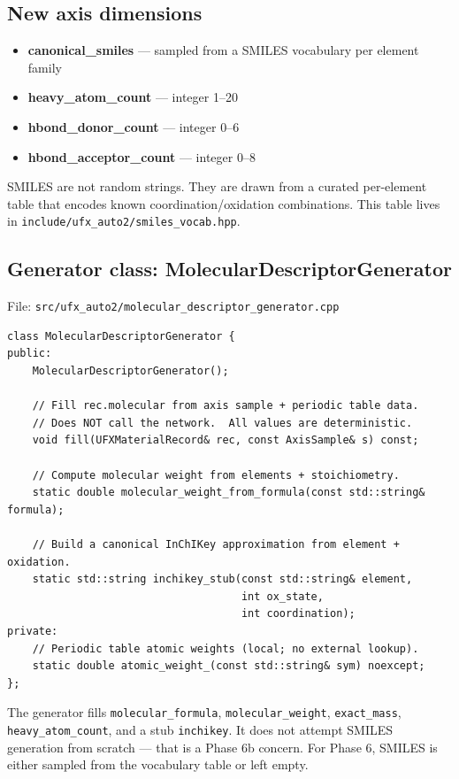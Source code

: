 \documentclass[11pt, a4paper]{article}
\begin{document}
\subsection{New axis dimensions}

\begin{itemize}[leftmargin=*, itemsep=2pt]
  \item \textbf{canonical\_smiles} --- sampled from a SMILES vocabulary per element family
  \item \textbf{heavy\_atom\_count} --- integer 1--20
  \item \textbf{hbond\_donor\_count} --- integer 0--6
  \item \textbf{hbond\_acceptor\_count} --- integer 0--8
\end{itemize}

SMILES are not random strings.  They are drawn from a curated per-element table
that encodes known coordination/oxidation combinations.  This table lives in
\texttt{include/ufx\_auto2/smiles\_vocab.hpp}.

\subsection{Generator class: MolecularDescriptorGenerator}

File: \texttt{src/ufx\_auto2/molecular\_descriptor\_generator.cpp}

\begin{lstlisting}
class MolecularDescriptorGenerator {
public:
	MolecularDescriptorGenerator();

	// Fill rec.molecular from axis sample + periodic table data.
	// Does NOT call the network.  All values are deterministic.
	void fill(UFXMaterialRecord& rec, const AxisSample& s) const;

	// Compute molecular weight from elements + stoichiometry.
	static double molecular_weight_from_formula(const std::string& formula);

	// Build a canonical InChIKey approximation from element + oxidation.
	static std::string inchikey_stub(const std::string& element,
									 int ox_state,
									 int coordination);
private:
	// Periodic table atomic weights (local; no external lookup).
	static double atomic_weight_(const std::string& sym) noexcept;
};
\end{lstlisting}

The generator fills \texttt{molecular\_formula}, \texttt{molecular\_weight},
\texttt{exact\_mass}, \texttt{heavy\_atom\_count}, and a stub \texttt{inchikey}.
It does not attempt SMILES generation from scratch --- that is a Phase 6b concern.
For Phase 6, SMILES is either sampled from the vocabulary table or left empty.
\end{document}
